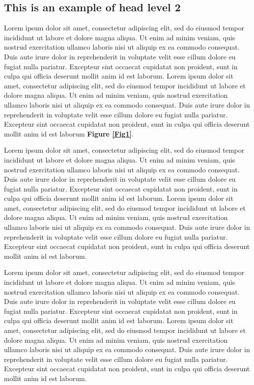 \documentclass{sbc2023}%
\begin{document}
\subsection{This is an example of head level 2}

Lorem ipsum dolor sit amet, consectetur adipiscing elit, sed do eiusmod tempor incididunt ut labore et dolore magna aliqua. Ut enim ad minim veniam, quis nostrud exercitation ullamco laboris nisi ut aliquip ex ea commodo consequat. Duis aute irure dolor in reprehenderit in voluptate velit esse cillum dolore eu fugiat nulla pariatur. Excepteur sint occaecat cupidatat non proident, sunt in culpa qui officia deserunt mollit anim id est laborum. Lorem ipsum dolor sit amet, consectetur adipiscing elit, sed do eiusmod tempor incididunt ut labore et dolore magna aliqua. Ut enim ad minim veniam, quis nostrud exercitation ullamco laboris nisi ut aliquip ex ea commodo consequat. Duis aute irure dolor in reprehenderit in voluptate velit esse cillum dolore eu fugiat nulla pariatur. Excepteur sint occaecat cupidatat non proident, sunt in culpa qui officia deserunt mollit anim id est laborum \textbf{Figure \ref{Fig1}}.

Lorem ipsum dolor sit amet, consectetur adipiscing elit, sed do eiusmod tempor incididunt ut labore et dolore magna aliqua. Ut enim ad minim veniam, quis nostrud exercitation ullamco laboris nisi ut aliquip ex ea commodo consequat. Duis aute irure dolor in reprehenderit in voluptate velit esse cillum dolore eu fugiat nulla pariatur. Excepteur sint occaecat cupidatat non proident, sunt in culpa qui officia deserunt mollit anim id est laborum. Lorem ipsum dolor sit amet, consectetur adipiscing elit, sed do eiusmod tempor incididunt ut labore et dolore magna aliqua. Ut enim ad minim veniam, quis nostrud exercitation ullamco laboris nisi ut aliquip ex ea commodo consequat. Duis aute irure dolor in reprehenderit in voluptate velit esse cillum dolore eu fugiat nulla pariatur. Excepteur sint occaecat cupidatat non proident, sunt in culpa qui officia deserunt mollit anim id est laborum.

Lorem ipsum dolor sit amet, consectetur adipiscing elit, sed do eiusmod tempor incididunt ut labore et dolore magna aliqua. Ut enim ad minim veniam, quis nostrud exercitation ullamco laboris nisi ut aliquip ex ea commodo consequat. Duis aute irure dolor in reprehenderit in voluptate velit esse cillum dolore eu fugiat nulla pariatur. Excepteur sint occaecat cupidatat non proident, sunt in culpa qui officia deserunt mollit anim id est laborum. Lorem ipsum dolor sit amet, consectetur adipiscing elit, sed do eiusmod tempor incididunt ut labore et dolore magna aliqua. Ut enim ad minim veniam, quis nostrud exercitation ullamco laboris nisi ut aliquip ex ea commodo consequat. Duis aute irure dolor in reprehenderit in voluptate velit esse cillum dolore eu fugiat nulla pariatur. Excepteur sint occaecat cupidatat non proident, sunt in culpa qui officia deserunt mollit anim id est laborum.
\end{document}
